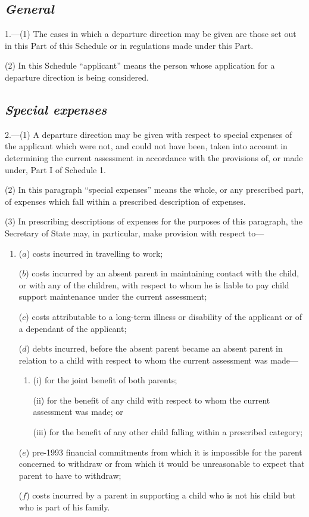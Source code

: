 \documentclass[12pt,a4paper]{article}
\begin{document}
\renewcommand\parthead{--- Schedule 4B Part I}

\subsection*{\itshape General}

1.---(1) The cases in which a departure direction may be given are those set out in this Part of this Schedule or in regulations made under this Part.

(2) In this Schedule “applicant” means the person whose application for a departure direction is being considered.

\subsection*{\itshape Special expenses}

2.---(1) A departure direction may be given with respect to special expenses of the applicant which were not, and could not have been, taken into account in determining the current assessment in accordance with the provisions of, or made under, Part I of Schedule 1.

(2) In this paragraph “special expenses” means the whole, or any prescribed part, of expenses which fall within a prescribed description of expenses.

(3) In prescribing descriptions of expenses for the purposes of this paragraph, the Secretary of State may, in particular, make provision with respect to—
\begin{enumerate}\item[]
($a$) costs incurred in travelling to work;

($b$) costs incurred by an absent parent in maintaining contact with the child, or with any of the children, with respect to whom he is liable to pay child support maintenance under the current assessment;

($c$) costs attributable to a long-term illness or disability of the applicant or of a dependant of the applicant;

($d$) debts incurred, before the absent parent became an absent parent in relation to a child with respect to whom the current assessment was made—
\begin{enumerate}\item[]
(i) for the joint benefit of both parents;

(ii) for the benefit of any child with respect to whom the current assessment was made; or

(iii) for the benefit of any other child falling within a prescribed category;
\end{enumerate}

($e$) pre-1993 financial commitments from which it is impossible for the parent concerned to withdraw or from which it would be unreasonable to expect that parent to have to withdraw;

($f$) costs incurred by a parent in supporting a child who is not his child but who is part of his family.
\end{enumerate}
\end{document}
